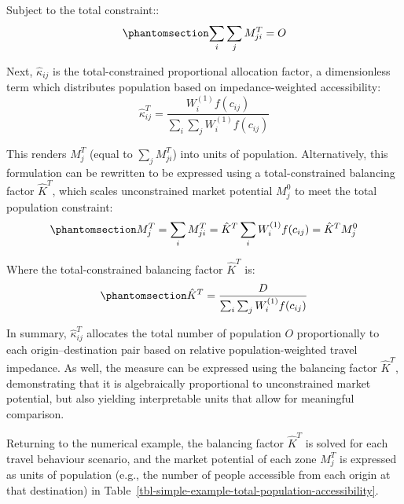 \documentclass[
  10pt,
  letterpaper,
]{article}
\begin{document}
\noindent Subject to the total constraint::
\begin{equation}\phantomsection\label{eq-total-constraint-O}{
\sum_i \sum_j M^T_{ji} =  O
}\end{equation}

Next, \(\hat \kappa_{ij}\) is the total-constrained proportional
allocation factor, a dimensionless term which distributes population
based on impedance-weighted accessibility: \[
\hat \kappa_{ij}^T = \frac{W^{(1)}_i f(c_{ij})}{\sum_i\sum_j W^{(1)}_if(c_{ij})}
\]

This renders \(M_j^T\) (equal to \(\sum_jM_{ji}^T\)) into units of
population. Alternatively, this formulation can be rewritten to be
expressed using a total-constrained balancing factor \(\hat K^T\), which
scales unconstrained market potential \(M_j^0\) to meet the total
population constraint:
\begin{equation}\phantomsection\label{eq-total-constrained-market-potential}{
M^T_j = \sum_i M^T_{ji} = \hat K^T \sum_i W^{(1)}_if(c_{ij}) = \hat K^T  M^0_j
}\end{equation}

Where the total-constrained balancing factor \(\hat K^T\) is:
\begin{equation}\phantomsection\label{eq-total-population-balancing-factor}{
\hat K^T = \frac{D}{\sum_i\sum_j W^{(1)}_if(c_{ij})}
}\end{equation}

In summary, \(\hat \kappa_{ij}^T\) allocates the total number of
population \(O\) proportionally to each origin--destination pair based
on relative population-weighted travel impedance. As well, the measure
can be expressed using the balancing factor \(\hat K^T\), demonstrating
that it is algebraically proportional to unconstrained market potential,
but also yielding interpretable units that allow for meaningful
comparison.

Returning to the numerical example, the balancing factor \(\hat K^T\) is
solved for each travel behaviour scenario, and the market potential of
each zone \(M^T_j\) is expressed as units of population (e.g., the
number of people accessible from each origin at that destination) in
Table~\ref{tbl-simple-example-total-population-accessibility}.
\end{document}
